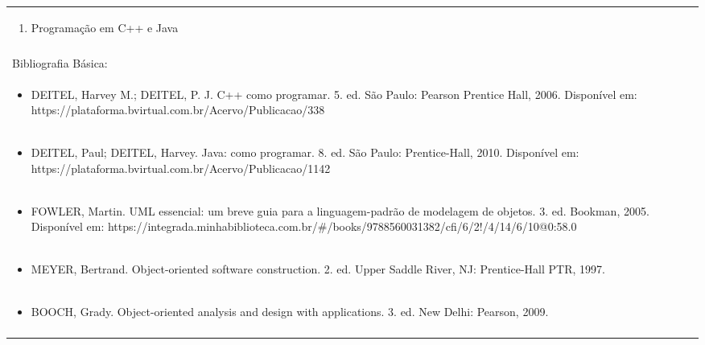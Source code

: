\documentclass[11pt]{article}
\begin{document}
\begin{center}
\begin{longtable}{|p{4cm}|p{4cm}|p{4cm}|p{4cm}|}
\multicolumn{4}{|p{\dimexpr 16cm + 6\tabcolsep\relax}|}{\begin{enumerate}[start=12]\item Programação em C++ e Java\end{enumerate}}\\
\multicolumn{4}{|p{\dimexpr 16cm + 6\tabcolsep\relax}|}{}\\
\hline
\multicolumn{4}{|p{16cm}|}{Bibliografia Básica:}\\*
\multicolumn{4}{|p{\dimexpr 16cm + 6\tabcolsep\relax}|}{\begin{itemize}\item DEITEL, Harvey M.; DEITEL, P. J. C++ como programar. 5. ed. São Paulo: Pearson Prentice Hall, 2006. Disponível em: https://plataforma.bvirtual.com.br/Acervo/Publicacao/338\end{itemize}}\\
\multicolumn{4}{|p{\dimexpr 16cm + 6\tabcolsep\relax}|}{\begin{itemize}\item DEITEL, Paul; DEITEL, Harvey. Java: como programar. 8. ed. São Paulo: Prentice-Hall, 2010. Disponível em: https://plataforma.bvirtual.com.br/Acervo/Publicacao/1142\end{itemize}}\\
\multicolumn{4}{|p{\dimexpr 16cm + 6\tabcolsep\relax}|}{\begin{itemize}\item FOWLER, Martin. UML essencial: um breve guia para a linguagem-padrão de modelagem de objetos. 3. ed. Bookman, 2005. Disponível em: https://integrada.minhabiblioteca.com.br/\#/books/9788560031382/cfi/6/2!/4/14/6/10@0:58.0\end{itemize}}\\
\multicolumn{4}{|p{\dimexpr 16cm + 6\tabcolsep\relax}|}{\begin{itemize}\item MEYER, Bertrand. Object-oriented software construction. 2. ed. Upper Saddle River, NJ: Prentice-Hall PTR, 1997.\end{itemize}}\\
\multicolumn{4}{|p{\dimexpr 16cm + 6\tabcolsep\relax}|}{\begin{itemize}\item BOOCH, Grady. Object-oriented analysis and design with applications. 3. ed. New Delhi: Pearson, 2009.\end{itemize}}\\
\multicolumn{4}{|p{16cm}|}{}\\
\hline

\end{longtable}
\end{center}
\end{document}
